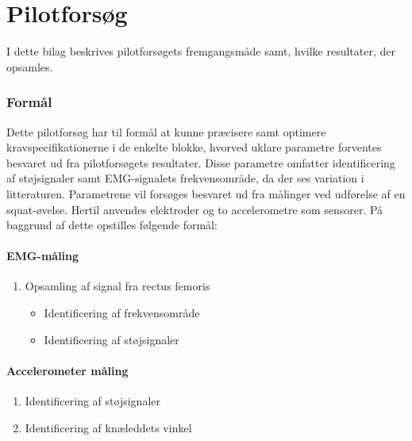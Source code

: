 \chapter{Pilotforsøg} \label{sec:pilotforsoeg}
I dette bilag beskrives pilotforsøgets fremgangsmåde samt, hvilke resultater, der opsamles. 

\subsection{Formål}
Dette pilotforsøg har til formål at kunne præcisere samt optimere kravspecifikationerne i de enkelte blokke, hvorved uklare parametre forventes besvaret ud fra pilotforsøgets resultater. Disse parametre omfatter identificering af støjsignaler samt EMG-signalets frekvensområde, da der ses variation i litteraturen. Parametrene vil forsøges besvaret ud fra målinger ved udførelse af en squat-øvelse.
Hertil anvendes elektroder og to accelerometre som sensorer. På baggrund af dette opstilles følgende formål:  

\subsubsection{EMG-måling}
\begin{enumerate}
\item Opsamling af signal fra rectus femoris %
	\begin{itemize}
	\item Identificering af frekvensområde
	\item Identificering af støjsignaler 
	\end{itemize}
\end{enumerate}

\subsubsection{Accelerometer måling}
\begin{enumerate}
\item Identificering af støjsignaler 
\item Identificering af knæleddets vinkel
\end{enumerate}

